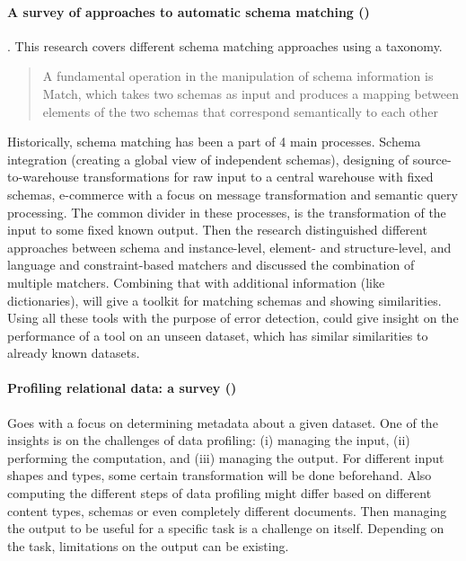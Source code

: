 \paragraph{A survey of approaches to automatic schema matching (\cite{Rahm2001-ei})}. This research covers different schema matching approaches using a taxonomy. 
\blockquote{A fundamental operation in the manipulation of schema information is Match, which takes two schemas as input and produces a mapping between elements of the two schemas that correspond semantically to each other}
Historically, schema matching has been a part of 4 main processes. Schema integration (creating a global view of independent schemas), designing of source-to-warehouse transformations for raw input to a central warehouse with fixed schemas, e-commerce with a focus on message transformation and semantic query processing. 
The common divider in these processes, is the transformation of the input to some fixed known output.  
Then the research distinguished different approaches between schema and instance-level, element- and structure-level, and language and constraint-based matchers and discussed the combination of multiple matchers. Combining that with additional information (like dictionaries), will give a toolkit for matching schemas and showing similarities. 
Using all these tools with the purpose of error detection, could give insight on the performance of a tool on an unseen dataset, which has similar similarities to already known datasets.

\paragraph{Profiling relational data: a survey (\cite{Abedjan2015-ul})} 
Goes with a focus on determining metadata about a given dataset. One of the insights is on the challenges of data profiling: (i) managing the input, (ii) performing the computation, and (iii) managing the output. For different input shapes and types, some certain transformation will be done beforehand. Also computing the different steps of data profiling might differ based on different content types, schemas or even completely different documents. Then managing the output to be useful for a specific task is a challenge on itself. Depending on the task, limitations on the output can be existing. 



